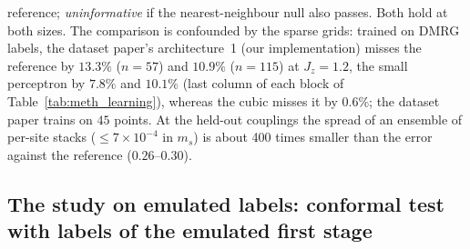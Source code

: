 \documentclass[aps,prx,onecolumn,10pt,nofootinbib,longbibliography,floatfix]{revtex4-2}
\theoremstyle{remark}
\newcommand{\Jz}{J_z}
\newcommand{\ms}{m_s}
\begin{document}
reference; \emph{uninformative} if the nearest-neighbour null also passes. Both hold at both sizes. The comparison is
confounded by the sparse grids: trained on DMRG labels, the dataset paper's architecture~1 (our implementation) misses the reference %
by $13.3\%$ ($n=57$) and $10.9\%$ ($n=115$) at $\Jz=1.2$, the small perceptron by $7.8\%$ and $10.1\%$ (last column %
of each block of Table~\ref{tab:meth_learning}), whereas the cubic misses it by $0.6\%$; the dataset paper trains %
on $45$ points. At the held-out couplings the spread of an ensemble of per-site stacks ($\le7\times10^{-4}$ in $\ms$) %
is about 400 times smaller than the error against the reference ($0.26$--$0.30$). %

\def\SMcap{Out-of-distribution test of the learners, relative $\ms$ error in percent. Each block is one model
trained on the same-method labels ($n=57$: the 10 grid points $\Jz=1.6$, $1.8$, $2.0$, $2.2$, $2.5$, $3.0$, $3.5$, %
$4.0$, $5.0$, $6.0$; $n=115$: the 7 points $1.6$, $2.0$, $2.5$, $3.0$, $4.0$, $5.0$, $6.0$). For each size: the error %
against new same-method labels (the validation a data generator can run), against the DMRG reference, and,
for comparison, the error of the same model trained on DMRG labels. Read along a row: the smooth models and the
nearest-neighbour null match the new same-method labels to within $1.5\,\%$ while missing the reference by tens of %
percent.}\def\SMlab{tab:meth_learning}
\LTclearhead


\subsection{The study on emulated labels: conformal test with labels of the emulated first stage}
\label{sm:realistic}
\end{document}
